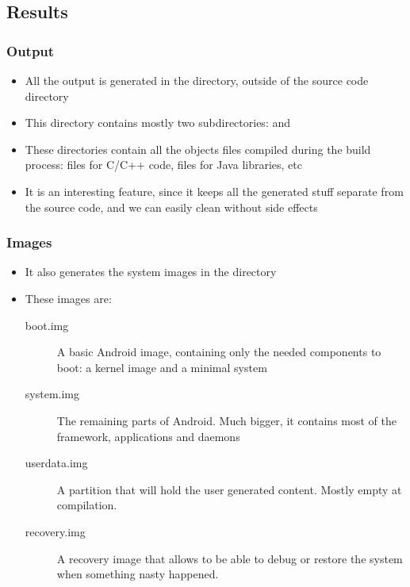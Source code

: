 \subsection{Results}

\begin{frame}
  \frametitle{Output}
  \begin{itemize}
  \item All the output is generated in the
     directory, outside of the source code directory 
  \item This directory contains mostly two subdirectories:
     and 
  \item These directories contain all the objects files compiled
    during the build process:  files for C/C++ code,
     files for Java libraries, etc
  \item It is an interesting feature, since it keeps all the generated
    stuff separate from the source code, and we can easily clean without
    side effects
  \end{itemize}
\end{frame}

\begin{frame}
  \frametitle{Images}
  \begin{itemize}
  \item It also generates the system images in the
     directory
  \item These images are:
    \begin{description}
    \item[boot.img] A basic Android image, containing only the needed
      components to boot: a kernel image and a minimal system
    \item[system.img] The remaining parts of Android. Much bigger, it
      contains most of the framework, applications and daemons
    \item[userdata.img] A partition that will hold the user generated
      content. Mostly empty at compilation.
    \item[recovery.img] A recovery image that allows to be able to
      debug or restore the system when something nasty happened.
    \end{description}
  \end{itemize}
\end{frame}


